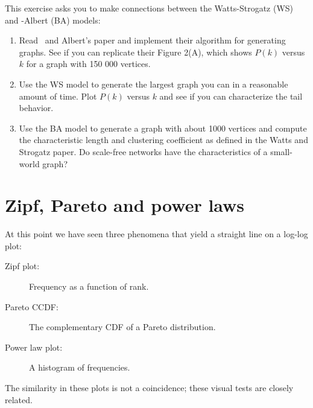 \documentclass[10pt]{book}
\begin{document}
\begin{ex}

This exercise asks you to make connections between the Watts-Strogatz (WS)
and \Barabasi-Albert (BA) models:

\begin{enumerate}

\item Read \Barabasi~and Albert's paper and implement their algorithm
for generating graphs.  See if you can replicate their Figure 2(A),
which shows $P(k)$ versus $k$ for a graph with 150 000 vertices.

\item Use the WS model to generate the largest graph you can in
a reasonable amount of time.  Plot $P(k)$ versus $k$ and see if
you can characterize the tail behavior.

\item Use the BA model to generate a graph with about 1000 vertices
and compute the characteristic length and clustering coefficient
as defined in the Watts and Strogatz paper.  Do scale-free networks
have the characteristics of a small-world graph?

\end{enumerate}

\end{ex}


\section{Zipf, Pareto and power laws}


At this point we have seen three phenomena that yield a straight line
on a log-log plot:

\begin{description}

\item[Zipf plot:] Frequency as a function of rank. 

\item[Pareto CCDF:] The complementary CDF of a Pareto distribution.

\item[Power law plot:] A histogram of frequencies.

\end{description}

The similarity in these plots is not a coincidence; these
visual tests are closely related.
\end{document}
